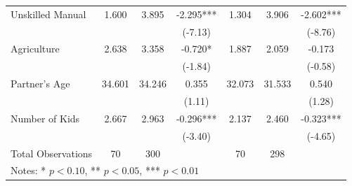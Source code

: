 \begin{table}[htbp]
\begin{tabular}{lcccccc}
\hspace{0.2in}Unskilled Manual & 1.600 & 3.895 & -2.295*** & 1.304 & 3.906 & -2.602*** \\
 & & & (-7.13) & & & (-8.76) \\
\hspace{0.2in}Agriculture & 2.638 & 3.358 & -0.720* & 1.887 & 2.059 & -0.173 \\
 & & & (-1.84) & & & (-0.58) \\
Partner's Age & 34.601 & 34.246 & 0.355 & 32.073 & 31.533 & 0.540 \\
 & & & (1.11) & & & (1.28) \\
Number of Kids & 2.667 & 2.963 & -0.296*** & 2.137 & 2.460 & -0.323*** \\
 & & & (-3.40) & & & (-4.65) \\
\midrule
Total Observations & 70 & 300 & & 70 & 298 & \\
\bottomrule
\multicolumn{7}{l}{\footnotesize Notes: * $p<0.10$, ** $p<0.05$, *** $p<0.01$} \\
\end{tabular}
\end{table}

